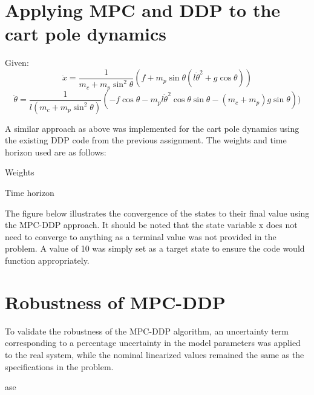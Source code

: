 \documentclass{article}
\begin{document}
\section {Applying MPC and DDP to the cart pole dynamics}

Given:
\begin{equation}
\ddot{x} = \frac{1}{m_c + m_p{\sin}^2\theta}(f + m_p \sin\theta(l{\dot{\theta}}^2 + g\cos\theta))
\end{equation}
\begin{equation}
\ddot{\theta} = \frac{1}{l(m_c + m_p{\sin}^2{\theta})}(-f\cos\theta - m_pl{\dot{\theta}}^2\cos{\theta}\sin{\theta} - (m_c + m_p)g\sin\theta))
\end{equation}


A similar approach as above was implemented for the cart pole dynamics using the existing DDP code from the previous assignment. The weights and time horizon used are as follows:


Weights

Time horizon


The figure below illustrates the convergence of the states to their final value using the MPC-DDP approach. It should be noted that the state variable x does not need to converge to anything as a terminal value was not provided in the problem. A value of 10 was simply set as a target state to ensure the code would function appropriately.


\section {Robustness of MPC-DDP}

To validate the robustness of the MPC-DDP algorithm, an uncertainty term corresponding to a percentage uncertainty in the model parameters was applied to the real system, while the nominal linearized values remained the same as the specifications in the problem. 










ase
\end{document}
